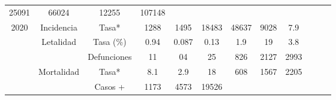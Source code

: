 \begin{tabular}{ccc|cccccc|lll}
		\multicolumn{1}{c|}{\cellcolor[HTML]{FFCE93}25091} &
		\multicolumn{1}{c|}{\cellcolor[HTML]{FFCE93}66024} &
		\multicolumn{1}{c|}{\cellcolor[HTML]{FFCE93}12255} &
		\cellcolor[HTML]{FFCE93}107148 &
		&
		&
		\\ \cline{3-9}
		\multicolumn{1}{|c|}{\multirow{-5}{*}{\cellcolor[HTML]{FFCE93}2020}} &
		\multicolumn{1}{c|}{\cellcolor[HTML]{FFCE93}Incidencia} &
		\cellcolor[HTML]{FFCE93}Tasa* &
		\multicolumn{1}{c|}{\cellcolor[HTML]{FFCE93}1288} &
		\multicolumn{1}{c|}{\cellcolor[HTML]{FFCE93}1495} &
		\multicolumn{1}{c|}{\cellcolor[HTML]{FFCE93}18483} &
		\multicolumn{1}{c|}{\cellcolor[HTML]{FFCE93}48637} &
		\multicolumn{1}{c|}{\cellcolor[HTML]{FFCE93}9028} &
		\cellcolor[HTML]{FFCE93}7.9 &
		&
		&
		\\ \cline{1-9}
		\multicolumn{1}{|c|}{\cellcolor[HTML]{FFFC9E}} &
		\multicolumn{1}{c|}{\cellcolor[HTML]{FFFC9E}Letalidad} &
		\cellcolor[HTML]{FFFC9E}Tasa (\%) &
		\multicolumn{1}{c|}{\cellcolor[HTML]{FFFC9E}0.94} &
		\multicolumn{1}{c|}{\cellcolor[HTML]{FFFC9E}0.087} &
		\multicolumn{1}{c|}{\cellcolor[HTML]{FFFC9E}0.13} &
		\multicolumn{1}{c|}{\cellcolor[HTML]{FFFC9E}1.9} &
		\multicolumn{1}{c|}{\cellcolor[HTML]{FFFC9E}19} &
		\cellcolor[HTML]{FFFC9E}3.8 &
		&
		&
		\\ \cline{2-9}
		\multicolumn{1}{|c|}{\cellcolor[HTML]{FFFC9E}} &
		\multicolumn{1}{c|}{\cellcolor[HTML]{FFFC9E}} &
		\cellcolor[HTML]{FFFC9E}Defunciones &
		\multicolumn{1}{c|}{\cellcolor[HTML]{FFFC9E}11} &
		\multicolumn{1}{c|}{\cellcolor[HTML]{FFFC9E}04} &
		\multicolumn{1}{c|}{\cellcolor[HTML]{FFFC9E}25} &
		\multicolumn{1}{c|}{\cellcolor[HTML]{FFFC9E}826} &
		\multicolumn{1}{c|}{\cellcolor[HTML]{FFFC9E}2127} &
		\cellcolor[HTML]{FFFC9E}2993 &
		&
		&
		\\ \cline{2-9}
		\multicolumn{1}{|c|}{\cellcolor[HTML]{FFFC9E}} &
		\multicolumn{1}{c|}{\cellcolor[HTML]{FFFC9E}Mortalidad} &
		\cellcolor[HTML]{FFFC9E}Tasa* &
		\multicolumn{1}{c|}{\cellcolor[HTML]{FFFC9E}8.1} &
		\multicolumn{1}{c|}{\cellcolor[HTML]{FFFC9E}2.9} &
		\multicolumn{1}{c|}{\cellcolor[HTML]{FFFC9E}18} &
		\multicolumn{1}{c|}{\cellcolor[HTML]{FFFC9E}608} &
		\multicolumn{1}{c|}{\cellcolor[HTML]{FFFC9E}1567} &
		\cellcolor[HTML]{FFFC9E}2205 &
		&
		&
		\\ \cline{2-9}
		\multicolumn{1}{|c|}{\cellcolor[HTML]{FFFC9E}} &
		\multicolumn{1}{c|}{\cellcolor[HTML]{FFFC9E}} &
		\cellcolor[HTML]{FFFC9E}Casos + &
		\multicolumn{1}{c|}{\cellcolor[HTML]{FFFC9E}1173} &
		\multicolumn{1}{c|}{\cellcolor[HTML]{FFFC9E}4573} &
		\multicolumn{1}{c|}{\cellcolor[HTML]{FFFC9E}19526} &

\end{tabular}
